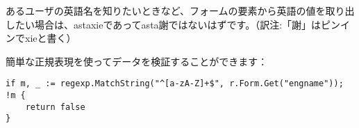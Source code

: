 あるユーザの英語名を知りたいときなど、フォームの要素から英語の値を取り出したい場合は、astaxieであってasta謝ではないはずです。（訳注:「謝」はピンインでxieと書く）


簡単な正規表現を使ってデータを検証することができます：

\begin{lstlisting}[numbers=none]
if m, _ := regexp.MatchString("^[a-zA-Z]+$", r.Form.Get("engname")); !m {
    return false
}
\end{lstlisting}
